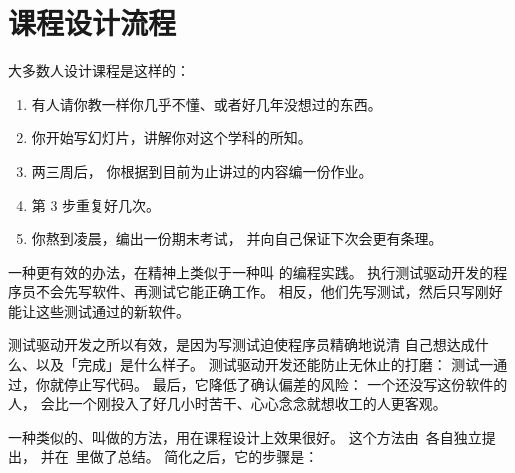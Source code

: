 \chapter{课程设计流程}\label{s:process}

大多数人设计课程是这样的：

\begin{enumerate}

\item
  有人请你教一样你几乎不懂、或者好几年没想过的东西。

\item
  你开始写幻灯片，讲解你对这个学科的所知。

\item
  两三周后，
  你根据到目前为止讲过的内容编一份作业。

\item
  第 3 步重复好几次。

\item
  你熬到凌晨，编出一份期末考试，
  并向自己保证下次会更有条理。

\end{enumerate}

一种更有效的办法，在精神上类似于一种叫
的编程实践。
执行测试驱动开发的程序员不会先写软件、再测试它能正确工作。
相反，他们先写测试，然后只写刚好能让这些测试通过的新软件。

测试驱动开发之所以有效，是因为写测试迫使程序员精确地说清
自己想达成什么、以及「完成」是什么样子。
测试驱动开发还能防止无休止的打磨：
测试一通过，你就停止写代码。
最后，它降低了确认偏差的风险：
一个还没写这份软件的人，
会比一个刚投入了好几小时苦干、心心念念就想收工的人更客观。

一种类似的、叫做的方法，用在课程设计上效果很好。
这个方法由~\cite{Wigg2005,Bigg2011,Fink2013}各自独立提出，
并在~\cite{McTi2013}里做了总结。
简化之后，它的步骤是：

